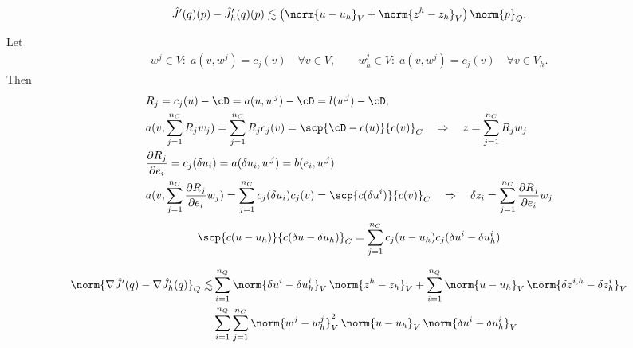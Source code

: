 %
\begin{corollary}\label{cor:}
%
\begin{equation}\label{eq:}
\hat J'(q)(p) - \hat J_h'(q)(p) \lesssim \left( \norm{u-u_h}_V + \norm{z^h-z_h}_V \right) \norm{p}_Q.
\end{equation}
%
\end{corollary}
%

Let
%
\begin{align*}
w^j\in V:\; a(v,w^j) = c_j(v)\quad\forall v\in V,\qquad w_h^j\in V:\; a(v,w^j)= c_j(v)\quad\forall v\in V_h.
\end{align*}
%
Then
%
\begin{align*}
&R_j = c_j(u) - \cD = a(u,w^j) - \cD = l(w^j) - \cD,\\
&a(v, \sum_{j=1}^{n_C} R_j w_j) = \sum_{j=1}^{n_C} R_j c_j(v) = \scp{\cD-c(u)}{c(v)}_C\quad\Rightarrow\quad 
z = \sum_{j=1}^{n_C} R_j w_j\\
&\frac{\partial R_j}{\partial e_i} = c_j(\delta u_i) = a(\delta u_i,w^j) = b(e_i, w^j)\\
&a(v, \sum_{j=1}^{n_C}  \frac{\partial R_j}{\partial e_i}w_j) = \sum_{j=1}^{n_C}c_j(\delta u_i) c_j(v) = \scp{c(\delta u^i)}{c(v)}_C\quad\Rightarrow\quad \delta z_i = \sum_{j=1}^{n_C} \frac{\partial R_j}{\partial e_i} w_j
\end{align*}
%
%
\begin{align*}
\scp{c(u-u_h)}{c(\delta u-\delta u_h)}_C = \sum_{j=1}^{n_C} c_j(u-u_h)c_j(\delta u^i-\delta u^i_h)
\end{align*}
%

%
\begin{corollary}\label{cor:}
%
\begin{equation}\label{eq:}
\begin{split}
\norm{\nabla \hat J'(q)- \nabla\hat J_h'(q)}_Q \lesssim& \sum_{i=1}^{n_Q} \norm{\delta u^i-\delta u^i_h}_V\,\norm{z^h-z_h}_V +  \sum_{i=1}^{n_Q} \norm{u- u_h}_V\,\norm{\delta z^{i,h}-\delta z_h^i}_V\\
&  \sum_{i=1}^{n_Q}\sum_{j=1}^{n_C} \norm{w^j- w^j_h}^2_V\,\norm{u- u_h}_V\,\norm{\delta u^i-\delta u^i_h}_V
\end{split}
\end{equation}
%
\end{corollary}

%
